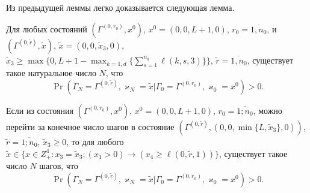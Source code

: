 \documentclass[a4paper,12pt,russian]{extarticle}
\begin{document}
Из предыдущей леммы легко доказывается следующая лемма.
\begin{lemma}
Для любых состояний $(\Gamma^{(0,r_0)},x^0)$, $x^0=(0,0,L+1,0)$,  $r_0=\overline{1,n_0}$, и
$(\Gamma^{(0,\tilde{r})},\tilde{x})$,
$\tilde{x}=(0,0,\tilde{x}_3,0)$, $\tilde{x}_3\geqslant \max{\{0,L+1-\max_{k=\overline{1,d}}{\{ \sum_{s=1}^{n_k}\ell(k,s,3)\}}\}}$,
$\tilde{r} = \overline{1,n_0}$, существует такое натуральное число $N$, что 
\begin{equation*}
\Pr(\Gamma_{N}=\Gamma^{(0,\tilde{r} )}, \varkappa_{N}=\tilde{x}|
\Gamma_{0}=\Gamma^{(0,r_0)}, \varkappa_{0}=x^0)>0.
\end{equation*}
\end{lemma}

\begin{lemma}
Если из состояния $(\Gamma^{(0,r_0)},x^0)$, $x^0=(0,0,L+1,0)$, $r_0=\overline{1;n_0}$, можно перейти за конечное число шагов в состояние $(\Gamma^{(0,\tilde{r})},(0,0,\min\{L,\tilde{x}_3\},0))$, $\tilde{r}=\overline{1;n_0}$, $\tilde{x}_3\geqslant 0$, то для любого $\tilde{x}\in \{x \in Z_+^4\colon x_3=\tilde{x}_3; (x_1 > 0)\rightarrow (x_4\geqslant \ell(0,\tilde{r},1))\}$, существует такое число $N$ шагов, что
\begin{equation*}
\Pr(\Gamma_{N}=\Gamma^{(0,\tilde{r} )}, \varkappa_{N}=\tilde{x}|
\Gamma_{0}=\Gamma^{(0,r_0)}, \varkappa_{0}=x^0)>0.
\end{equation*}
\end{lemma}
\end{document}
